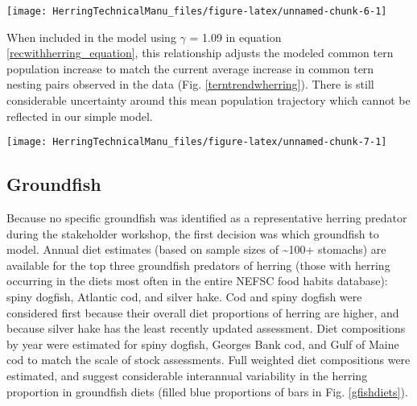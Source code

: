\documentclass[]{article}
\let\origfigure\figure
\let\endorigfigure\endfigure
\renewenvironment{figure}[1][2] {
    \expandafter\origfigure\expandafter[H]
} {
    \endorigfigure
}
\begin{document}
\begin{figure}

{\centering \texttt{[image: HerringTechnicalManu\_files/figure-latex/unnamed-chunk-6-1]} 

}

\caption{Modeled influence of herring total biomass on tern reproductive success \label{herrternmod}}\label{fig:unnamed-chunk-6}
\end{figure}

When included in the model using \(\gamma\) = 1.09 in equation
\ref{recwithherring_equation}, this relationship adjusts the modeled
common tern population increase to match the current average increase in
common tern nesting pairs observed in the data (Fig.
\ref{terntrendwherring}). There is still considerable uncertainty around
this mean population trajectory which cannot be reflected in our simple
model.

\begin{figure}

{\centering \texttt{[image: HerringTechnicalManu\_files/figure-latex/unnamed-chunk-7-1]} 

}

\caption{Population trends for Gulf of Maine terns with simulated herring-common tern productivity relationship \label{terntrendwherring}}\label{fig:unnamed-chunk-7}
\end{figure}

\subsection{Groundfish}\label{groundfish}

Because no specific groundfish was identified as a representative
herring predator during the stakeholder workshop, the first decision was
which groundfish to model. Annual diet estimates (based on sample sizes
of \textasciitilde{}100+ stomachs) are available for the top three
groundfish predators of herring (those with herring occurring in the
diets most often in the entire NEFSC food habits database): spiny
dogfish, Atlantic cod, and silver hake. Cod and spiny dogfish were
considered first because their overall diet proportions of herring are
higher, and because silver hake has the least recently updated
assessment. Diet compositions by year were estimated for spiny dogfish,
Georges Bank cod, and Gulf of Maine cod to match the scale of stock
assessments. Full weighted diet compositions were estimated, and suggest
considerable interannual variability in the herring proportion in
groundfish diets (filled blue proportions of bars in Fig.
\ref{gfishdiets}).
\end{document}
